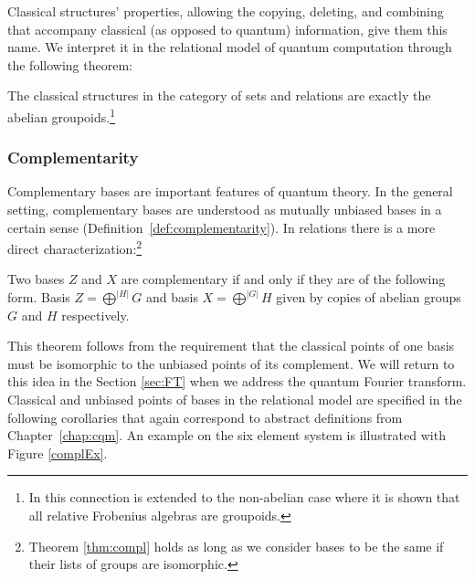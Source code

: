Classical structures' properties, allowing the copying, deleting, and combining that accompany classical (as opposed to quantum) information, give them this name. We interpret it in the relational model of quantum computation through the following theorem:

\begin{lemma}
\label{lem:sdfa-rel}
The classical structures in the category of sets and relations are exactly the abelian groupoids.\footnote{In \cite{heunen-relFrob} this connection is extended to the non-abelian case where it is shown that all relative Frobenius algebras are groupoids.}
\end{lemma}

\subsubsection*{Complementarity}
Complementary bases are important features of quantum theory. In the general setting, complementary bases are understood as mutually unbiased bases in a certain sense (Definition~\ref{def:complementarity}).  In relations there is a more direct characterization:\footnote{Theorem \ref{thm:compl} holds as long as we consider bases to be the same if their lists of groups are isomorphic.}
\begin{theorem}
\label{thm:compl}
Two bases $Z$ and $X$ are complementary if and only if they are of the following form. Basis $Z = \bigoplus^{|H|}G$ and basis $X = \bigoplus^{|G|}H$ given by copies of abelian groups $G$ and $H$ respectively.
\end{theorem}

This theorem follows from the requirement that the classical points of one basis must be isomorphic to the unbiased points of its complement. We will return to this idea in the Section \ref{sec:FT} when we address the quantum Fourier transform. Classical and unbiased points of bases in the relational model are specified in the following corollaries that again correspond to abstract definitions from Chapter~\ref{chap:cqm}. An example on the six element system is illustrated with Figure \ref{complEx}.

